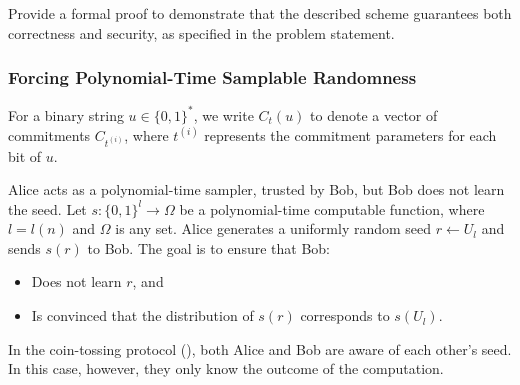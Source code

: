 \begin{exercise}
    Provide a formal proof to demonstrate that the described scheme guarantees both correctness and security, as specified in the problem statement.
\end{exercise}

\subsubsection{Forcing Polynomial-Time Samplable Randomness}

\begin{suggestion}
    For a binary string $u \in \{ 0, 1 \}^*$, we write $C_t(u)$ to denote a vector of commitments $C_{t^{(i)}}$, where $t^{(i)}$ represents the commitment parameters for each bit of $u$.
\end{suggestion}

\begin{problem}
    Alice acts as a polynomial-time sampler, trusted by Bob, but Bob does not learn the seed. 
    Let $s \colon \{ 0, 1 \}^l \to \Omega$ be a polynomial-time computable function, where $l = l(n)$ and $\Omega$ is any set. 
    Alice generates a uniformly random seed $r \gets U_l$ and sends $s(r)$ to Bob. 
    The goal is to ensure that Bob:
    \begin{itemize}
        \item Does not learn $r$, and
        \item Is convinced that the distribution of $s(r)$ corresponds to $s(U_l)$.
    \end{itemize}
\end{problem}

\begin{remark}
    In the coin-tossing protocol (), both Alice and Bob are aware of each other's seed. 
    In this case, however, they only know the outcome of the computation.
\end{remark}

